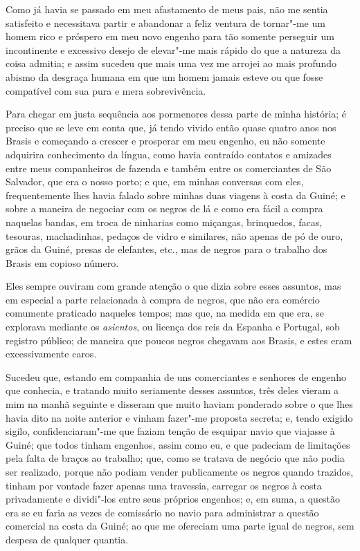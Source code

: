 Como já havia se passado em meu afastamento de meus pais, não me sentia
satisfeito e necessitava partir e abandonar a feliz ventura de tornar"-me
um homem rico e próspero em meu novo engenho para tão somente perseguir
um incontinente e excessivo desejo de elevar"-me mais rápido do que a
natureza da coisa admitia; e assim sucedeu que mais uma vez me arrojei
ao mais profundo abismo da desgraça humana em que um homem jamais esteve
ou que fosse compatível com sua pura e mera sobrevivência.

Para chegar em justa sequência aos pormenores dessa parte de minha
história; é preciso que se leve em conta que, já tendo vivido então
quase quatro anos nos Brasis e começando a crescer e prosperar em meu
engenho, eu não somente adquirira conhecimento da língua, como havia
contraído contatos e amizades entre meus companheiros de fazenda e
também entre os comerciantes de São Salvador, que era o nosso porto; e
que, em minhas conversas com eles, frequentemente lhes havia falado
sobre minhas duas viagens à costa da Guiné; e sobre a maneira de
negociar com os negros de lá e como era fácil a compra naquelas bandas,
em troca de ninharias como miçangas, brinquedos, facas, tesouras,
machadinhas, pedaços de vidro e similares, não apenas de pó de ouro,
grãos da Guiné, presas de elefantes, etc., mas de negros para o trabalho
dos Brasis em copioso número.

Eles sempre ouviram com grande atenção o que dizia sobre esses assuntos,
mas em especial a parte relacionada à compra de negros, que não era
comércio comumente praticado naqueles tempos; mas que, na medida em que
era, se explorava mediante os \emph{asientos}, ou licença dos reis da
Espanha e Portugal, sob registro público; de maneira que poucos negros
chegavam aos Brasis, e estes eram excessivamente caros.

Sucedeu que, estando em companhia de uns comerciantes e senhores de
engenho que conhecia, e tratando muito seriamente desses assuntos, três
deles vieram a mim na manhã seguinte e disseram que muito haviam
ponderado sobre o que lhes havia dito na noite anterior e vinham
fazer"-me proposta secreta; e, tendo exigido sigilo, confidenciaram"-me
que faziam tenção de esquipar navio que viajasse à Guiné; que todos
tinham engenhos, assim como eu, e que padeciam de limitações pela falta
de braços ao trabalho; que, como se tratava de negócio que não podia ser
realizado, porque não podiam vender publicamente os negros quando
trazidos, tinham por vontade fazer apenas uma travessia, carregar os
negros à costa privadamente e dividi"-los entre seus próprios engenhos;
e, em suma, a questão era se eu faria as vezes de comissário no navio
para administrar a questão comercial na costa da Guiné; ao que me
ofereciam uma parte igual de negros, sem despesa de qualquer quantia.

